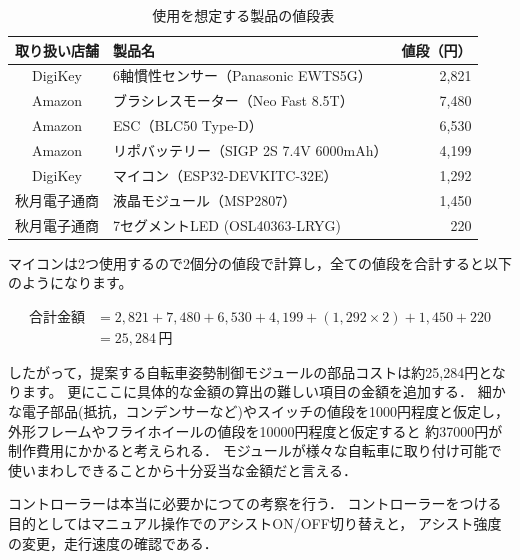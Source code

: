 \documentclass[uplatex,dvipdfmx]{jsarticle}
\begin{document}
\begin{table}[h]
  \centering
  \caption{使用を想定する製品の値段表}
  \label{table:Price}
  \begin{tabular}{clr}
\hline
取り扱い店舗 & 製品名 & 値段（円） \\\hline \hline
DigiKey & 6軸慣性センサー（Panasonic EWTS5G） & 2,821 \\\hline
Amazon & ブラシレスモーター（Neo Fast 8.5T） & 7,480 \\\hline
Amazon & ESC（BLC50 Type-D） & 6,530  \\\hline
Amazon & リポバッテリー（SIGP 2S 7.4V 6000mAh） & 4,199 \\\hline
DigiKey & マイコン（ESP32-DEVKITC-32E） & 1,292 \\\hline
秋月電子通商 & 液晶モジュール（MSP2807） & 1,450 \\\hline
秋月電子通商 & 7セグメントLED (OSL40363-LRYG) & 220 \\\hline
  \end{tabular}
\end{table}

マイコンは2つ使用するので2個分の値段で計算し，全ての値段を合計すると以下のようになります。

\begin{align*}
\text{合計金額} &= 2,821 + 7,480 + 6,530 + 4,199 + (1,292 \times 2) + 1,450 + 220 \\
&= 25,284 \, \text{円}
\end{align*}

したがって，提案する自転車姿勢制御モジュールの部品コストは約25,284円となります。
更にここに具体的な金額の算出の難しい項目の金額を追加する．
細かな電子部品(抵抗，コンデンサーなど)やスイッチの値段を1000円程度と仮定し，
外形フレームやフライホイールの値段を10000円程度と仮定すると
約37000円が制作費用にかかると考えられる．
モジュールが様々な自転車に取り付け可能で使いまわしできることから十分妥当な金額だと言える．


コントローラーは本当に必要かにつての考察を行う．
コントローラーをつける目的としてはマニュアル操作でのアシストON/OFF切り替えと，
アシスト強度の変更，走行速度の確認である．
\end{document}

